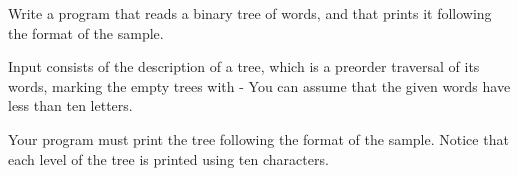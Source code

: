


\Statement

Write a program that reads a binary tree of words,
and that prints it following the format of the sample.



\Input

Input consists of the description of a tree, which is a preorder
traversal of its words, marking the empty trees with -
You can assume that the given words have less than ten letters.



\Output

Your program must print the tree following the format of the sample.
Notice that each level of the tree is printed using ten characters.



\SampleOneCol
